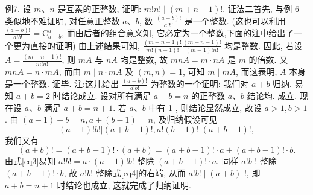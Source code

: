 例7. 设 $m 、 n$ 是互素的正整数, 证明: $m ! n ! \mid(m+n-1) !$.
证法二首先, 与例 6 类似地不难证明, 对任意正整数 $a 、 b$, 数 $\frac{(a+b) !}{a ! b !}$ 是一个整数.
(这也可以利用 $\frac{(a+b) !}{a ! b !}=\mathrm{C}_{a+b}^a$, 而由后者的组合意义知, 它必定为一个整数,下面的注中给出了一个更为直接的证明)
由上述结果可知, $\frac{(m+n-1) !}{m !(n-1) !} \frac{(m+n-1) !}{(m-1) ! n !}$ 均是整数.
因此, 若设 $A= \frac{(m+n-1) !}{m ! n !}$, 则 $m A$ 与 $n A$ 均是整数, 故 $m n A=m \cdot n A$ 是 $m$ 的倍数.
又 $m n A=n \cdot m A$, 而由 $m \mid n \cdot m A$ 及 $(m, n)=1$, 可知 $m \mid m A$, 而这表明, $A$ 本身是一个整数.
证毕.
注:这儿给出 $\frac{(a+b) !}{a ! b !}$ 为整数的一个证明:
我们对 $a+b$ 归纳.
易知 $a+b=2$ 时结论成立.
设对所有满足 $a+b=n$ 的正整数 $a 、 b$ 结论均.
成立.
现在设 $a 、 b$ 满足 $a+b=n+1$. 若 $a 、 b$ 中有 1 , 则结论显然成立, 故设 $a>1, b>1$. 由 $(a-1)+b=n, a+(b-1)=n$, 及归纳假设可见
$$
(a-1) ! b !|(a+b-1) !, a !(b-1) !|(a+b-1) !, \label{eq3}
$$
我们又有
$$
(a+b) !=(a+b-1) ! \cdot(a+b)=(a+b-1) ! \cdot a+(a+b-1) ! \cdot b . \label{eq4}
$$
由式\ref{eq3}易知 $a ! b !=a \cdot(a-1) ! b !$ 整除 $(a+b-1) ! \cdot a$. 同样 $a ! b$ ! 整除 $(a+b- 1) ! \cdot b$, 故 $a ! b !$ 整除式\ref{eq4}的右端, 从而 $a ! b ! \mid(a+b)$ !, 即 $a+b=n+1$ 时结论也成立, 这就完成了归纳证明.


